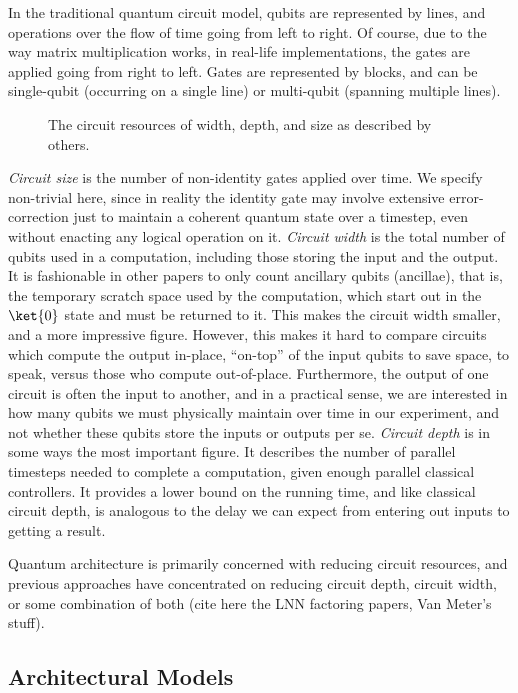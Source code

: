 In the traditional quantum circuit model, qubits are represented by lines,
and operations over the flow of time going from left to right. Of course,
due to the way matrix multiplication works, in real-life implementations,
the gates are applied going from right to left. Gates are represented by
blocks, and can be single-qubit (occurring on a single line) or
multi-qubit (spanning multiple lines).

\begin{figure}
\label{fig:circuit-resource.tex}
\caption{The circuit resources of width, depth, and size as described by others.}
\end{figure}

\emph{Circuit size} is the number of non-identity gates applied over time.
We specify non-trivial here, since in reality the identity gate may involve
extensive error-correction just to maintain a coherent quantum state over
a timestep, even without enacting any logical operation on it.
\emph{Circuit width} is the total number of qubits used in a computation,
including those storing the input and the output. It is fashionable in other
papers to only count ancillary qubits (ancillae), that is, the temporary 
scratch space used by the computation, which start out in the $\ket{0}$ state
and must be returned to it. This makes the circuit width smaller, and a more
impressive figure. However, this makes it hard to compare circuits
which compute the output in-place, ``on-top'' of the input qubits to save
space, to speak, versus those who compute out-of-place. Furthermore,
the output of one circuit is often the input to another, and in a practical sense,
we are interested in how many qubits we must physically maintain over time in
our experiment, and not whether these qubits store the inputs or outputs per se.
\emph{Circuit depth} is in some ways the most important figure. It describes
the number of parallel timesteps needed to complete a computation, given enough
parallel classical controllers. It provides a lower bound on the running time,
and like classical circuit depth, is analogous to the delay we can expect
from entering out inputs to getting a result.

Quantum architecture is primarily concerned with reducing circuit resources,
and previous approaches have concentrated on reducing circuit depth, circuit
width, or some combination of both (cite here the LNN factoring papers,
Van Meter's stuff).

\subsection{Architectural Models}

